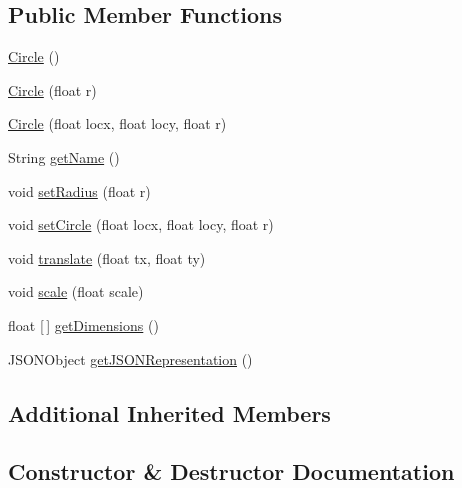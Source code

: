 \subsection*{Public Member Functions}
\begin{DoxyCompactItemize}
\item 
\hyperlink{classbridges_1_1base_1_1_circle_a807231dff01120041d7d209d049e3029}{Circle} ()
\item 
\hyperlink{classbridges_1_1base_1_1_circle_a32543e951646009960c1839b2b8e1a0a}{Circle} (float r)
\item 
\hyperlink{classbridges_1_1base_1_1_circle_a04460bea57f9ef4bd0a3d45e9a937096}{Circle} (float locx, float locy, float r)
\item 
String \hyperlink{classbridges_1_1base_1_1_circle_a3782ea68f0419747c00bd8b2bfa31462}{get\+Name} ()
\item 
void \hyperlink{classbridges_1_1base_1_1_circle_a38c9f2a569af42461323239ba90f559e}{set\+Radius} (float r)
\item 
void \hyperlink{classbridges_1_1base_1_1_circle_ac11cce75c482bb5c5751dfd1d5353b44}{set\+Circle} (float locx, float locy, float r)
\item 
void \hyperlink{classbridges_1_1base_1_1_circle_ad4e474d78a1aea48f947e76b96c93ccb}{translate} (float tx, float ty)
\item 
void \hyperlink{classbridges_1_1base_1_1_circle_acbb48177b6e99326294cd90f74b58a27}{scale} (float scale)
\item 
float \mbox{[}$\,$\mbox{]} \hyperlink{classbridges_1_1base_1_1_circle_a0752cc5f6e261ade3d27f34c1c566c80}{get\+Dimensions} ()
\item 
J\+S\+O\+N\+Object \hyperlink{classbridges_1_1base_1_1_circle_ad6a8b8e2dca562fd3fa5254ee861ed70}{get\+J\+S\+O\+N\+Representation} ()
\end{DoxyCompactItemize}
\subsection*{Additional Inherited Members}


\subsection{Constructor \& Destructor Documentation}
\mbox{\label{classbridges_1_1base_1_1_circle_a807231dff01120041d7d209d049e3029}} 
